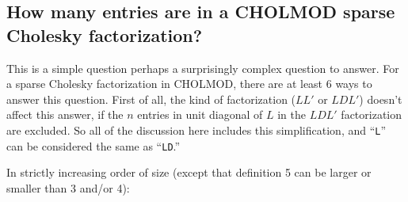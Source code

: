 \documentclass[11pt]{article}
\begin{document}
\subsection{How many entries are in a CHOLMOD sparse Cholesky factorization?}

This is a simple question perhaps a surprisingly complex question to answer.
For a sparse Cholesky factorization in CHOLMOD, there are at least 6 ways to
answer this question.  First of all, the kind of factorization ($LL'$ or
$LDL'$) doesn't affect this answer, if the $n$ entries in unit diagonal of $L$
in the $LDL'$ factorization are excluded.  So all of the discussion here
includes this simplification, and ``\verb'L''' can be considered the same
as ``\verb'LD'.''

In strictly increasing order of size (except that definition 5 can be larger or
smaller than 3 and/or 4):
\end{document}
